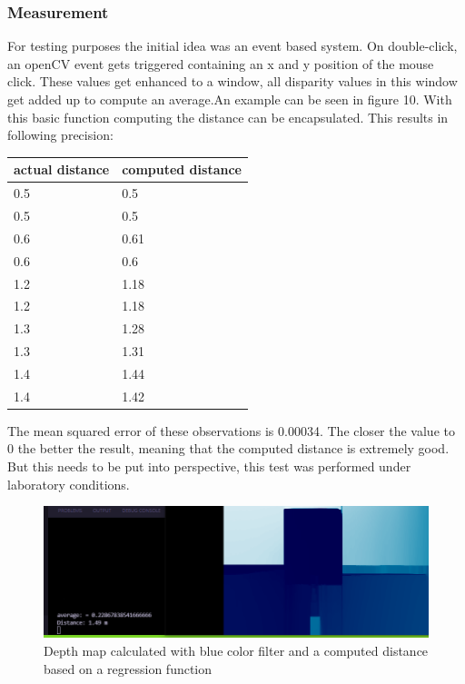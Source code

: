\documentclass[journal,onecolumn]{IEEEtran}
\begin{document}
\subsubsection{Measurement}
\noindent
For testing purposes the initial idea was an event based system. On double-click, an openCV event gets triggered containing an x and y position of the mouse click. These values get enhanced to a window, all disparity values in this window get added up to compute an average.An example can be seen in figure 10. With this basic function computing the distance can be encapsulated. This results in following precision:
\begin{table}[H]
	\begin{tabular}{|l|l|}
		\hline
		actual distance & computed distance \\ \hline
		0.5             & 0.5               \\ \hline
		0.5             & 0.5               \\ \hline
		0.6             & 0.61              \\ \hline
		0.6             & 0.6               \\ \hline
		1.2             & 1.18              \\ \hline
		1.2             & 1.18              \\ \hline
		1.3             & 1.28              \\ \hline
		1.3             & 1.31              \\ \hline
		1.4             & 1.44              \\ \hline
		1.4             & 1.42              \\ \hline
	\end{tabular}
\end{table}
\noindent The mean squared error of these observations is 0.00034. The closer the value to 0 the better the result, meaning that the computed distance is extremely good. But this needs to be put into perspective, this test was performed under laboratory conditions.
\begin{figure}[H]
	\centering
	\includegraphics[scale=0.5]{distanceCalcRegression.png}
	\captionsetup{justification=centering}
	\caption{Depth map calculated with blue color filter and a computed distance based on a regression function}
\end{figure}
\end{document}
